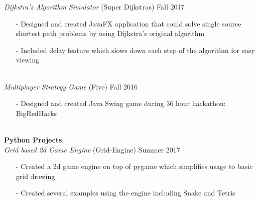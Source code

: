 \documentclass[10pt]{article}
\newcommand{\Indent}{\indent\indent}
\begin{document}
            \Indent \small\textit{Dijkstra's Algorithm Simulator}\small{ (Super Dijkstras)} \hfill \small{Fall 2017}\indent\vspace{0.5mm}\\
                \Indent\begin{minipage}{\dimexpr\textwidth-6cm}
                    \begin{itemize}[noitemsep, topsep=0pt]
                        \item[-] Designed and created JavaFX application that could solve single source shortest path problems by using Dijkstra's original algorithm
                        \item[-] Included delay feature which slows down each step of the algorithm for easy viewing
                    \end{itemize}\vspace{0mm}
                \end{minipage}\\
            \Indent \small\textit{Multiplayer Strategy Game}\small{ (Five)} \hfill \small{Fall 2016}\indent\vspace{0.5mm}\\
                \Indent\begin{minipage}{\dimexpr\textwidth-6cm}
                    \begin{itemize}[noitemsep, topsep=0pt]
                        \item[-] Designed and created Java Swing game during 36 hour hackathon: BigRedHacks
                    \end{itemize}\vspace{0mm}
                \end{minipage}\\
        \indent \small\textbf{Python Projects}\\
            \Indent \small\textit{Grid based 2d Game Engine}\small{ (Grid-Engine)} \hfill \small{Summer 2017}\indent\vspace{0.5mm}\\
                \Indent\begin{minipage}{\dimexpr\textwidth-6cm}
                    \begin{itemize}[noitemsep, topsep=0pt]
                        \item[-] Created a 2d game engine on top of pygame which simplifies usage to basic grid drawing
                        \item[-] Created several examples using the engine including Snake and Tetris
                    \end{itemize}\vspace{0mm}
                \end{minipage}\\
\end{document}
